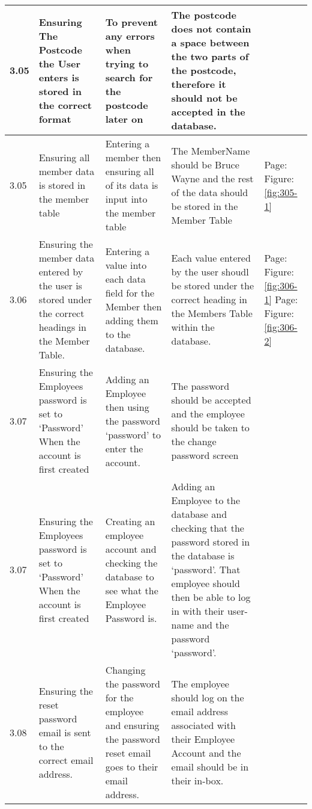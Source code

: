 \begin{flushleft}
\begin{longtable}{|p{1cm}|p{2.5cm}|p{2.5cm}|p{2cm}|p{2cm}|}
	\rowcolor{dark-grey}3.05 & Ensuring The Postcode the User enters is stored in the correct format  & To prevent any errors when trying to search for the postcode later on  & The postcode does not contain a space between the two parts of the postcode, therefore it should not be accepted in the database. & \\ \hline
	\rowcolor{light-grey}3.05 & Ensuring all member data is stored in the member table & Entering a member then ensuring all of its data is input into the member table  & The MemberName should be Bruce Wayne  and the rest of the data should be stored in the Member Table & Page:\pageref{fig:305-1}  \newline Figure:\ref{fig:305-1}\\ \hline
	\rowcolor{light-grey}3.06 & Ensuring the member data entered by the user is stored under the correct headings in the Member Table. & Entering a value into each data field for the Member then adding them to the database. & Each value entered by the user shoudl be stored under the correct heading in the Members Table within the database. &  Page:\pageref{fig:306-1}  \newline Figure:\ref{fig:306-1} \newline \newline  Page:\pageref{fig:306-2}  \newline Figure:\ref{fig:306-2} \\ \hline
	\rowcolor{dark-grey}3.07 & Ensuring the Employees password is set to `Password' When the account is first created & Adding an Employee then using the password `password' to enter the account. & The password should be accepted and the employee should be taken to the change password screen& \\ \hline
	\rowcolor{light-grey}3.07 & Ensuring the Employees password is set to `Password' When the account is first created & Creating an employee account and checking the database to see what the Employee Password is. & Adding an Employee to the database and checking that the password stored in the database is `password'. That employee should then be able to log in with their user-name and the password `password'. & \\ \hline
	\rowcolor{dark-grey}3.08 & Ensuring the reset password email is sent to the correct email address. & Changing the password for the employee and ensuring the password reset email goes to their email address. & The employee should log on the email address associated with their Employee Account and the email should be in their in-box.& \\ \hline

\end{longtable}
\end{flushleft}
